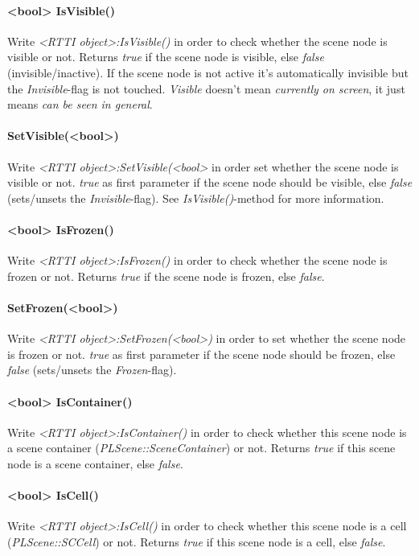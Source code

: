 \paragraph{<bool> IsVisible()}
Write \emph{<RTTI object>:IsVisible()} in order to check whether the scene node is visible or not. Returns \emph{true} if the scene node is visible, else \emph{false} (invisible/inactive). If the scene node is not active it's automatically invisible but the \emph{Invisible}-flag is not touched. \emph{Visible} doesn't mean \emph{currently on screen}, it just means \emph{can be seen in general}.

\paragraph{SetVisible(<bool>)}
Write \emph{<RTTI object>:SetVisible(<bool>} in order set whether the scene node is visible or not. \emph{true} as first parameter if the scene node should be visible, else \emph{false} (sets/unsets the \emph{Invisible}-flag). See \emph{IsVisible()}-method for more information.

\paragraph{<bool> IsFrozen()}
Write \emph{<RTTI object>:IsFrozen()} in order to check whether the scene node is frozen or not. Returns \emph{true} if the scene node is frozen, else \emph{false}.

\paragraph{SetFrozen(<bool>)}
Write \emph{<RTTI object>:SetFrozen(<bool>)} in order to set whether the scene node is frozen or not. \emph{true} as first parameter if the scene node should be frozen, else \emph{false} (sets/unsets the \emph{Frozen}-flag).

\paragraph{<bool> IsContainer()}
Write \emph{<RTTI object>:IsContainer()} in order to check whether this scene node is a scene container (\emph{PLScene::SceneContainer}) or not. Returns \emph{true} if this scene node is a scene container, else \emph{false}.

\paragraph{<bool> IsCell()}
Write \emph{<RTTI object>:IsCell()} in order to check whether this scene node is a cell (\emph{PLScene::SCCell}) or not. Returns \emph{true} if this scene node is a cell, else \emph{false}.

